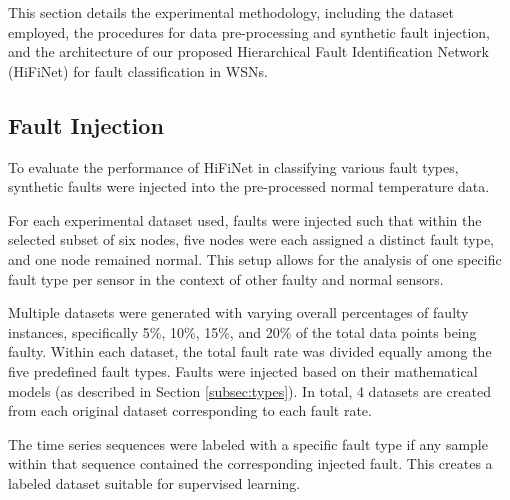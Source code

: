 This section details the experimental methodology, including the dataset employed, the procedures for data pre-processing and synthetic fault injection, and the architecture of our proposed Hierarchical Fault Identification Network (HiFiNet) for fault classification in WSNs.

\subsection{Fault Injection}
To evaluate the performance of HiFiNet in classifying various fault types, synthetic faults were injected into the pre-processed normal temperature data. 

For each experimental dataset used, faults were injected such that within the selected subset of six nodes, five nodes were each assigned a distinct fault type, and one node remained normal. This setup allows for the analysis of one specific fault type per sensor in the context of other faulty and normal sensors.

Multiple datasets were generated with varying overall percentages of faulty instances, specifically 5\%, 10\%, 15\%, and 20\% of the total data points being faulty. Within each dataset, the total fault rate was divided equally among the five predefined fault types. Faults were injected based on their mathematical models (as described in Section \ref{subsec:types}). In total, 4 datasets are created from each original dataset corresponding to each fault rate.

The time series sequences were labeled with a specific fault type if any sample within that sequence contained the corresponding injected fault. This creates a labeled dataset suitable for supervised learning.

